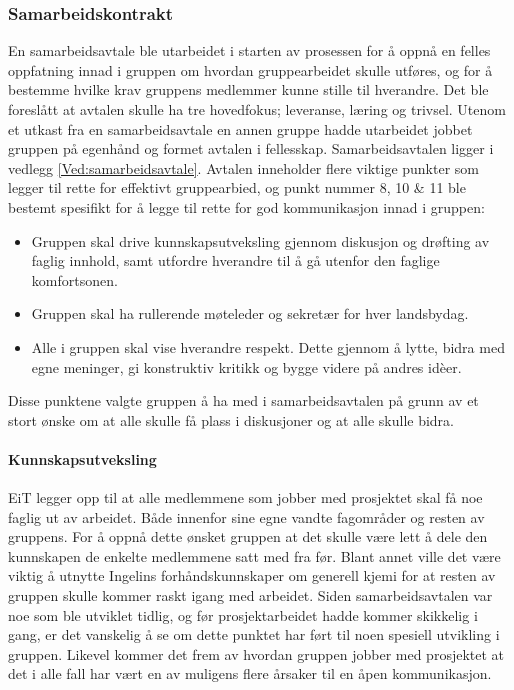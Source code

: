 \subsubsection{Samarbeidskontrakt}
En samarbeidsavtale ble utarbeidet i starten av prosessen for å oppnå en felles oppfatning innad i gruppen om hvordan gruppearbeidet skulle utføres, og for å bestemme hvilke krav gruppens medlemmer kunne stille til hverandre.
Det ble foreslått at avtalen skulle ha tre hovedfokus; leveranse, læring og trivsel.
Utenom et utkast fra en samarbeidsavtale en annen gruppe hadde utarbeidet jobbet gruppen på egenhånd og formet avtalen i fellesskap.
Samarbeidsavtalen ligger i vedlegg \ref{Ved:samarbeidsavtale}.
Avtalen inneholder flere viktige punkter som legger til rette for effektivt gruppearbied, og punkt nummer 8, 10 \& 11 ble bestemt spesifikt for å legge til rette for god kommunikasjon innad i gruppen:
\begin{itemize}
	\item Gruppen skal drive kunnskapsutveksling gjennom diskusjon og drøfting av faglig innhold, samt utfordre hverandre til å gå utenfor den faglige komfortsonen.
	\item Gruppen skal ha rullerende møteleder og sekretær for hver landsbydag.
	\item Alle i gruppen skal vise hverandre respekt. Dette gjennom å lytte, bidra med egne meninger, gi konstruktiv kritikk og bygge videre på andres id\`{e}er.
\end{itemize}

Disse punktene valgte gruppen å ha med i samarbeidsavtalen på grunn av et stort ønske om at alle skulle få plass i diskusjoner og at alle skulle bidra.

\paragraph{Kunnskapsutveksling}
EiT legger opp til at alle medlemmene som jobber med prosjektet skal få noe faglig ut av arbeidet.
Både innenfor sine egne vandte fagområder og resten av gruppens.
For å oppnå dette ønsket gruppen at det skulle være lett å dele den kunnskapen de enkelte medlemmene satt med fra før.
Blant annet ville det være viktig å utnytte Ingelins forhåndskunnskaper om generell kjemi for at resten av gruppen skulle kommer raskt igang med arbeidet.
Siden samarbeidsavtalen var noe som ble utviklet tidlig, og før prosjektarbeidet hadde kommer skikkelig i gang, er det vanskelig å se om dette punktet har ført til noen spesiell utvikling i gruppen.
Likevel kommer det frem av hvordan gruppen jobber med prosjektet at det i alle fall har vært en av muligens flere årsaker til en åpen kommunikasjon.

